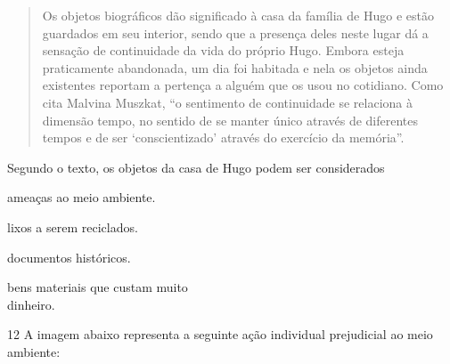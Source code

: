 \begin{quote}
Os objetos biográficos dão significado à casa da família de Hugo e
estão guardados em seu interior, sendo que a presença deles neste lugar
dá a sensação de continuidade da vida do próprio Hugo. Embora esteja
praticamente abandonada, um dia foi habitada e nela os objetos ainda
existentes reportam a pertença a alguém que os usou no cotidiano. Como
cita Malvina Muszkat, “o sentimento de continuidade se relaciona à
dimensão tempo, no sentido de se manter único através de diferentes
tempos e de ser `conscientizado' através do exercício da memória”.

\end{quote}

Segundo o texto, os objetos da casa de Hugo podem ser considerados

\begin{minipage}{.5\textwidth}
\begin{escolha}
\item ameaças ao meio ambiente.

\item lixos a serem reciclados.

\item documentos históricos.

\item bens materiais que custam muito\\ dinheiro.
\end{escolha}
\end{minipage}

\pagebreak
\num{12} A imagem abaixo representa a seguinte ação individual prejudicial ao meio ambiente:

